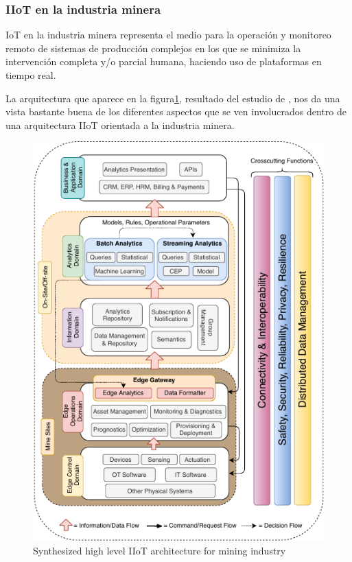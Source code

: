 \documentclass[stu,12pt,floatsintext]{apa7}
\begin{document}
	\subsubsection{IIoT en la industria minera}
	IoT en la industria minera representa el medio para la operación y monitoreo remoto de sistemas de producción complejos en los que se minimiza la intervención completa y/o parcial humana, haciendo uso de plataformas en tiempo real\cite{molaei:hal-02940030}.
	
	La arquitectura que aparece en la figura\ref{iiot_minas_arq_sintetizada}, resultado del estudio de  \cite{iot1020029}, nos da una vista bastante buena de los diferentes aspectos que se ven involucrados dentro de una arquitectura IIoT orientada a la industria minera.
		\begin{figure}[H]
		\centering
		\includegraphics[scale=0.8]{Synthesized_high_level_IIoT_architecture_for_mining_industry.png}
		\captionsetup{justification=centering}
		\caption{Synthesized high level IIoT architecture for mining industry}
		\small
		\label{iiot_minas_arq_sintetizada}
	\end{figure}
\end{document}
